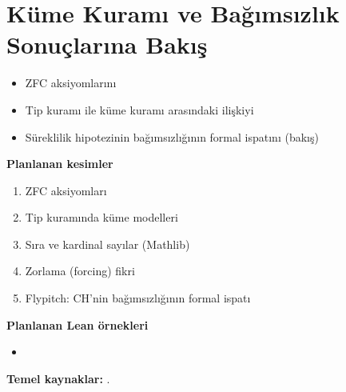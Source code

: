 \chapter{Küme Kuramı ve Bağımsızlık Sonuçlarına Bakış}\label{bol:kume-kurami}

\begin{bolumhedefleri}
\begin{itemize}
  \item ZFC aksiyomlarını
  \item Tip kuramı ile küme kuramı arasındaki ilişkiyi
  \item Süreklilik hipotezinin bağımsızlığının formal ispatını (bakış)
\end{itemize}
\end{bolumhedefleri}

\begin{taslakplan}
\textbf{Planlanan kesimler}
\begin{enumerate}[label=\thechapter.\arabic*, leftmargin=2.4em]
  \item ZFC aksiyomları
  \item Tip kuramında küme modelleri
  \item Sıra ve kardinal sayılar (Mathlib)
  \item Zorlama (forcing) fikri
  \item Flypitch: CH'nin bağımsızlığının formal ispatı
\end{enumerate}

\textbf{Planlanan Lean örnekleri}
\begin{itemize}
  \item {}
\end{itemize}

\textbf{Temel kaynaklar:} \citet{cohen1963,han2020flypitch,mathlib2020}.
\end{taslakplan}

